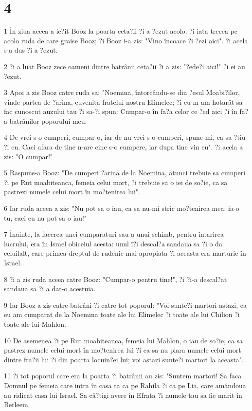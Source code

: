 \chapter{4}

\par 1 În ziua aceea a ie?it Booz la poarta ceta?ii ?i a ?ezut acolo. ?i iata trecea pe acolo ruda de care graise Booz; ?i Booz i-a zis: "Vino încoace ?i ?ezi aici". ?i acela s-a dus ?i a ?ezut.
\par 2 ?i a luat Booz zece oameni dintre batrânii ceta?ii ?i a zis: "?ede?i aici!" ?i ei au ?ezut.
\par 3 Apoi a zis Booz catre ruda sa: "Noemina, întorcându-se din ?esul Moabi?ilor, vinde partea de ?arina, cuvenita fratelui nostru Elimelec; ?i eu m-am hotarât sa fac cunoscut auzului tau ?i sa-?i spun: Cumpar-o în fa?a celor ce ?ed aici ?i în fa?a batrânilor poporului meu.
\par 4 De vrei s-o cumperi, cumpar-o, iar de nu vrei s-o cumperi, spune-mi, ca sa ?tiu ?i eu. Caci afara de tine n-are cine s-o cumpere, iar dupa tine vin eu". ?i acela a zis: "O cumpar!"
\par 5 Raspuns-a Booz: "De cumperi ?arina de la Noemina, atunci trebuie sa cumperi ?i pe Rut moabiteanca, femeia celui mort, ?i trebuie sa o iei de so?ie, ca sa pastrezi numele celui mort în mo?tenirea lui".
\par 6 Iar ruda aceea a zis: "Nu pot sa o iau, ca sa nu-mi stric mo?tenirea mea; ia-o tu, caci eu nu pot sa o iau!"
\par 7 Înainte, la facerea unei cumparaturi sau a unui schimb, pentru întarirea lucrului, era în Israel obiceiul acesta: unul î?i descal?a sandaua sa ?i o da celuilalt, care primea dreptul de rudenie mai apropiata ?i aceasta era marturie în Israel.
\par 8 ?i a zis ruda aceea catre Booz: "Cumpar-o pentru tine!", ?i ?i-a descal?at sandaua sa ?i a dat-o acestuia.
\par 9 Iar Booz a zis catre batrâni ?i catre tot poporul: "Voi sunte?i martori astazi, ca eu am cumparat de la Noemina toate ale lui Elimelec ?i toate ale lui Chilion ?i toate ale lui Mahlon.
\par 10 De asemenea ?i pe Rut moabiteanca, femeia lui Mahlon, o iau de so?ie, ca sa pastrez numele celui mort în mo?tenirea lui ?i ca sa nu piara numele celui mort dintre fra?ii lui ?i din poarta locuin?ei lui; voi astazi sunte?i martori la aceasta".
\par 11 ?i tot poporul care era la poarta ?i batrânii au zis: "Suntem martori! Sa faca Domnul pe femeia care intra în casa ta ca pe Rahila ?i ca pe Lia, care amândoua au ridicat casa lui Israel. Sa câ?tigi avere în Efrata ?i numele tau sa fie marit în Betleem.
